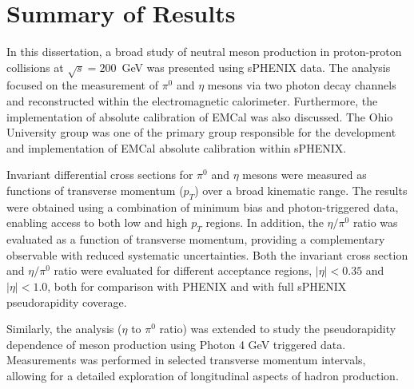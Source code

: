 
\section{Summary of Results}

In this dissertation, a broad study of neutral meson production in proton-proton collisions at $\sqrt{s} = 200$~GeV was presented using \ac{sPHENIX} data. The analysis focused on the measurement of $\pi^{0}$ and $\eta$ mesons via two photon decay channels and reconstructed within the electromagnetic calorimeter. Furthermore, the implementation of absolute calibration of \ac{EMCal} was also discussed. The Ohio University group was one of the primary group responsible for the development and implementation of \ac{EMCal} absolute calibration within \ac{sPHENIX}. 


Invariant differential cross sections for $\pi^{0}$ and $\eta$ mesons were measured as functions of transverse momentum ($p_T$) over a broad kinematic range. The results were obtained using a combination of minimum bias and photon-triggered data, enabling access to both low and high $p_T$ regions. In addition, the $\eta/\pi^{0}$ ratio was evaluated as a function of transverse momentum, providing a complementary observable with reduced systematic uncertainties. Both the invariant cross section and $\eta/\pi^{0}$ ratio were evaluated for different acceptance regions, $|\eta| < 0.35$ and $|\eta| < 1.0$, both for comparison with \ac{PHENIX} and with full \ac{sPHENIX} pseudorapidity coverage.


Similarly, the analysis ($\eta$ to $\pi^0$ ratio) was extended to study the pseudorapidity dependence of meson production using Photon 4 \ac{GeV} triggered data. Measurements was performed in selected transverse momentum intervals, allowing for a detailed exploration of longitudinal aspects of hadron production. 
